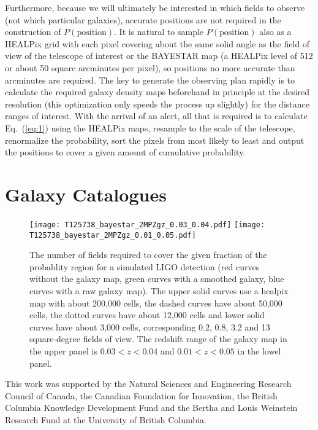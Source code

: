 \documentclass[useAMS,usenatbib]{mn2e}
\begin{document}
Furthermore, because we will ultimately be interested in which fields
to observe (not which particular galaxies), accurate positions are not
required in the construction of $P(\mathrm{position})$. It is natural
to sample $P(\mathrm{position})$ also as a HEALPix grid with each pixel
covering about the same solid angle as the field of view of the
telescope of interest or the BAYESTAR map (a HEALPix level of 512 or
about 50 square arcminutes per pixel), so positions no more accurate
than arcminutes are required.  The key to generate the observing plan
rapidly is to calculate the required galaxy density maps beforehand in
principle at the desired resolution (this optimization only speeds the
process up slightly) for the distance ranges of interest.  With the
arrival of an alert, all that is required is to calculate
Eq.~(\ref{eq:1}) using the HEALPix maps, resample to the scale of the
telescope, renormalize the probability, sort the pixels from most
likely to least and output the positions to cover a given amount of
cumulative probability.

\section{Galaxy Catalogues}



\begin{figure}
  \texttt{[image: T125738\_bayestar\_2MPZgz\_0.03\_0.04.pdf]} 
  \texttt{[image: T125738\_bayestar\_2MPZgz\_0.01\_0.05.pdf]} 
  \caption{The number of fields required to cover the given fraction
    of the probablity region for a simulated LIGO detection (red
    curves without the galaxy map, green curves with a smoothed
    galaxy, blue curves with a raw galaxy map).  The upper solid
    curves use a healpix map with about 200,000 cells, the dashed
    curves have about 50,000 cells, the dotted curves have about
    12,000 cells and lower solid curves have about 3,000 cells,
    corresponding 0.2, 0.8, 3.2 and 13 square-degree fields of
    view. The redshift range of the galaxy map in the upper panel is
    $0.03<z<0.04$ and $0.01<z<0.05$ in the lowel panel.}
\end{figure}

This work was supported by the Natural Sciences and Engineering
Research Council of Canada, the Canadian Foundation for Innovation,
the British Columbia Knowledge Development Fund and the Bertha and
Louis Weinstein Research Fund at the University of British Columbia.





\label{lastpage}
\end{document}
